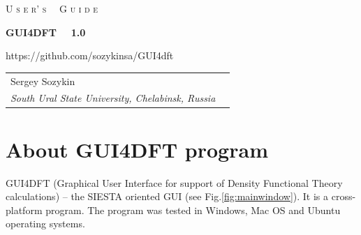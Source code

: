 \documentclass{article}
\begin{document}
\begin{titlepage}
	
	\begin{center}
		
		\vspace{1cm}

		{\Huge \textsc{U s e r' s \, \, G u i d e}}
		
		
		\vspace{1cm}
		\hrulefill
		\vspace{1cm}
		
		{\Huge \textbf{GUI4DFT \, \, 1.0}}
		
		\vspace{1cm}
		\hrulefill
		\vspace{0.5cm}
		
		
		\vspace{1.5cm}
		{\Large https://github.com/sozykinsa/GUI4dft}
		
		\vspace{2.5cm}
		\vspace{1.0cm}
		
		\begin{tabular}{ll}
			
			Sergey Sozykin  \\  %
			\textit{South Ural State University, Chelabinsk, Russia} \\
			
						
		\end{tabular}
		
	\end{center}
	
\end{titlepage}

	
	
\section{About GUI4DFT program}

GUI4DFT (Graphical User Interface for support of Density Functional Theory calculations) -- the SIESTA oriented GUI (see Fig.\ref{fig:mainwindow}). It is a cross-platform program. The program was tested in Windows, Mac OS and Ubuntu operating systems.
\end{document}
